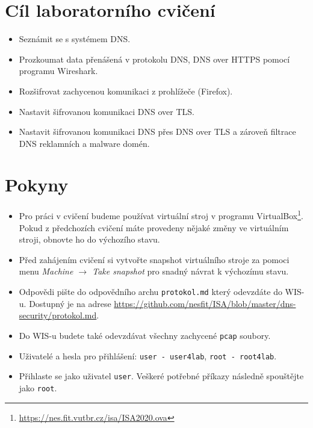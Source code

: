 \section*{Cíl laboratorního cvičení}
\begin{itemize}
  \item Seznámit se s systémem DNS.
  \item Prozkoumat data přenášená v protokolu DNS, DNS over HTTPS pomocí programu Wireshark.
  \item Rozšifrovat zachycenou komunikaci z prohlížeče (Firefox).
  \item Nastavit šifrovanou komunikaci DNS over TLS.
  \item Nastavit šifrovanou komunikaci DNS přes DNS over TLS a zároveň filtrace DNS reklamních a malware domén.
\end{itemize}

\section*{Pokyny}
\begin{itemize}
  \item Pro práci v cvičení budeme používat virtuální stroj v programu
  VirtualBox\footnote{\url{https://nes.fit.vutbr.cz/isa/ISA2020.ova}}. Pokud z předchozích cvičení máte provedeny nějaké změny ve virtuálním stroji, obnovte ho do výchozího stavu.
  \item Před zahájením cvičení si vytvořte snapshot virtuálního stroje za pomoci menu \textit{Machine $\rightarrow$ Take snapshot} pro snadný návrat k výchozímu stavu.
  \item Odpovědi pište do odpovědního archu \texttt{protokol.md} který odevzdáte do WIS-u. Dostupný je na adrese \url{https://github.com/nesfit/ISA/blob/master/dns-security/protokol.md}.
  \item Do WIS-u budete také odevzdávat všechny zachycené \texttt{pcap} soubory.
  \item Uživatelé a hesla pro přihlášení: \texttt{user - user4lab}, \texttt{root - root4lab}.
  \item Přihlaste se jako uživatel \texttt{user}. Veškeré potřebné příkazy následně spouštějte jako \texttt{root}.
\end{itemize}


